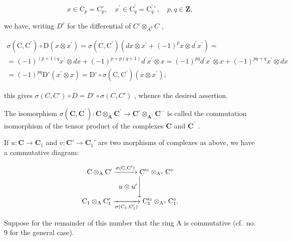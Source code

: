 \[
x \in \mathrm{C} _ {p} = \mathrm{C} _ {p} ^ {\circ}, \quad x ^ {\prime} \in \mathrm{C} _ {q} ^ {\prime} = \mathrm{C} _ {q} ^ {\prime \circ}, \quad p, q \in \mathbf {Z},
\]

we have, writing \(D^{c}\) for the differential of \(C' \otimes_{A^{0}} C\) ,

\[
\begin{array}{l} \sigma (\mathrm{C}, \mathrm{C} ^ {\prime}) \circ \mathrm{D} (x \otimes x ^ {\prime}) = \sigma (\mathrm{C}, \mathrm{C} ^ {\prime}) (d x \otimes x ^ {\prime} + (- 1) ^ {p} x \otimes d ^ {\prime} x ^ {\prime}) = \\ = (- 1) ^ {(p + 1) q} x ^ {\prime} \otimes d x + (- 1) ^ {p + p (q + 1)} d ^ {\prime} x ^ {\prime} \otimes x = (- 1) ^ {p q} d ^ {\prime} x ^ {\prime} \otimes x + (- 1) ^ {p q + q} x ^ {\prime} \otimes d x \\ = (- 1) ^ {p q} \mathrm{D} ^ {\circ} (x ^ {\prime} \otimes x) = \mathrm{D} ^ {\circ} \circ \sigma (\mathrm{C}, \mathrm{C} ^ {\prime}) (x \otimes x ^ {\prime}); \end{array}
\]

this gives \(\sigma(C, C') \circ D = D^{\circ} \circ \sigma(C, C')\) , whence the desired assertion.

The isomorphism \(\sigma(\mathbf{C},\mathbf{C}^{\prime}):\mathbf{C}\otimes_{\mathbf{A}}\mathbf{C}^{\prime}\to\mathbf{C}^{\circ}\otimes_{\mathbf{A}^{\circ}}\mathbf{C}^{-}\) is called the commutation isomorphism of the tensor product of the complexes \(\mathbf{C}\) and \(\mathbf{C}^{\prime}\) .

If \(u: \mathbf{C} \to \mathbf{C}_{1}\) and \(v: \mathbf{C}' \to \mathbf{C}_{1}'\) are two morphisms of complexes as above, we have a commutative diagram:

\[
\begin{array}{c} \mathrm{C} \otimes_ {\mathrm{A}} \mathrm{C} ^ {\prime} \xrightarrow {\sigma (\mathrm{C} , \mathrm{C} ^ {\prime})} \mathrm{C} ^ {\prime \circ} \otimes_ {\mathrm{A} ^ {\circ}} \mathrm{C} ^ {\circ} \\ u \otimes u ^ {\prime} \Bigg \downarrow \\ \mathrm{C} _ {1} \otimes_ {\mathrm{A}} \mathrm{C} _ {1} ^ {\prime} \xrightarrow [ \sigma (\mathrm{C} _ {1} , \mathrm{C} _ {1} ^ {\prime}) ]{} \mathrm{C} _ {1} ^ {\prime \circ} \otimes_ {\mathrm{A} ^ {\circ}} \mathrm{C} _ {1} ^ {\circ}. \end{array}
\]

Suppose for the remainder of this number that the ring A is commutative (cf.~no. 9 for the general case).

